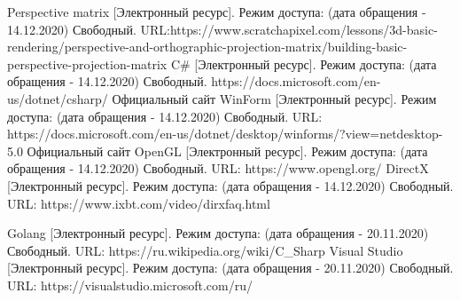 \documentclass{article}
\begin{document}
\begin{center}
\begin{thebibliography}{3}
Perspective matrix [Электронный ресурс]. Режим доступа: (дата обращения - 14.12.2020) Свободный. URL:https://www.scratchapixel.com/lessons/3d-basic-rendering/perspective-and-orthographic-projection-matrix/building-basic-perspective-projection-matrix
C\# [Электронный ресурс]. Режим доступа: (дата обращения - 14.12.2020) Свободный. https://docs.microsoft.com/en-us/dotnet/csharp/
Официальный сайт WinForm [Электронный ресурс]. Режим доступа: (дата обращения - 14.12.2020) Свободный. URL: https://docs.microsoft.com/en-us/dotnet/desktop/winforms/?view=netdesktop-5.0
Официальный сайт OpenGL [Электронный ресурс]. Режим доступа: (дата обращения - 14.12.2020) Свободный. URL: https://www.opengl.org/
DirectX [Электронный ресурс]. Режим доступа: (дата обращения - 14.12.2020) Свободный. URL: https://www.ixbt.com/video/dirxfaq.html


	Golang [Электронный ресурс]. Режим доступа: (дата обращения - 20.11.2020) Свободный. URL: https://ru.wikipedia.org/wiki/C\_Sharp
	Visual Studio [Электронный ресурс]. Режим доступа: (дата обращения - 20.11.2020) Свободный. URL: https://visualstudio.microsoft.com/ru/

	\end{thebibliography}
	\end{center}
\end{document}
